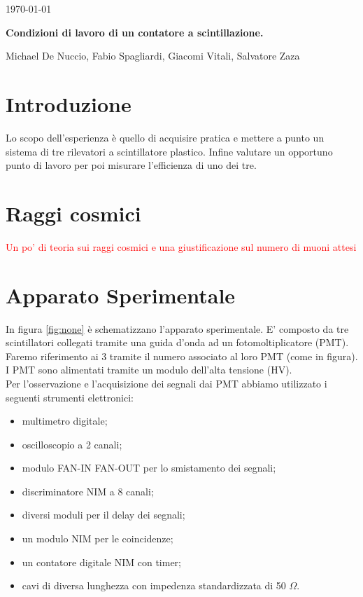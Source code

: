 \documentclass[a4paper,10pt]{article}
\newcommand{\note}[1]{\textcolor{red}{#1}}
\begin{document}
\begin{flushright}             
\today
\end{flushright} 

\begin{center}
\Large{\bf Condizioni di lavoro di un contatore a scintillazione. }

\vspace*{1cm}                                 
\large{Michael De Nuccio, Fabio Spagliardi, Giacomi Vitali, Salvatore Zaza }\\ 
\vspace*{0.5cm}       
\vspace*{1.cm}
\end{center}



\section{Introduzione}
\label{sec:intro} 
Lo scopo dell'esperienza è quello di acquisire pratica e mettere a punto un sistema di tre rilevatori a scintillatore plastico. Infine valutare un opportuno punto di lavoro per poi misurare l'efficienza di uno dei tre.

\section{Raggi cosmici}
\note{Un po' di teoria sui raggi cosmici e una giustificazione sul numero di muoni attesi}

\section{Apparato Sperimentale}
In figura \ref{fig:none} è schematizzano l'apparato sperimentale. E' composto da tre scintillatori collegati tramite una guida d'onda ad un fotomoltiplicatore (PMT). Faremo riferimento ai 3 tramite il numero associato al loro PMT (come in figura).
\\I PMT sono alimentati tramite un modulo dell'alta tensione (HV). 
\\Per l'osservazione e l'acquisizione dei segnali dai PMT abbiamo utilizzato i seguenti strumenti elettronici:
\begin{itemize}
\item multimetro digitale;
\item oscilloscopio a 2 canali;
\item modulo FAN-IN FAN-OUT per lo smistamento dei segnali;
\item discriminatore NIM a 8 canali;
\item diversi moduli per il delay dei segnali;
\item un modulo NIM per le coincidenze;
\item un contatore digitale NIM con timer;
\item cavi di diversa lunghezza con impedenza standardizzata di 50 $\Omega$.
\end{itemize}
\end{document}

